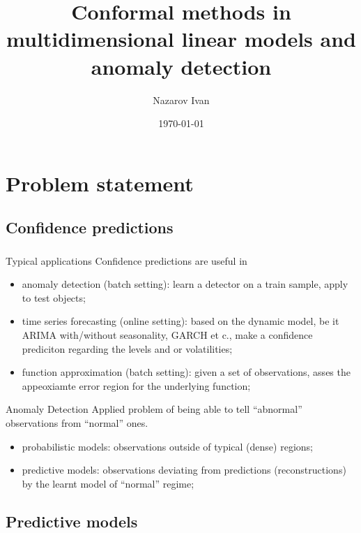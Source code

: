 \documentclass[t]{beamer}  %
\title{Conformal methods in multidimensional linear models and anomaly detection}
\author[Nazarov Ivan]{Nazarov Ivan}
\date{\today}
\institute[Higher School of Economics]{National Research University \\ Higher School of Economics}
\begin{document}
\frame[plain]{\titlepage} %

\section{Problem statement} %
\label{sec:problem_statement}
\subsection{Confidence predictions} %
\label{sub:confidence_predictions}

\begin{frame}[c]\frametitle{\insertsection}
  \framesubtitle{\insertsubsection}
  \begin{block}{Typical applications}
    Confidence predictions are useful in
    \begin{itemize}
      \item anomaly detection (batch setting): learn a detector on a train sample,
      apply to test objects;
      \item time series forecasting (online setting): based on the dynamic model, be
      it ARIMA with/without seasonality, GARCH et c., make a confidence prediciton
      regarding the levels and or volatilities;
      \item function approximation (batch setting): given a set of observations,
      asses the appeoxiamte error region for the underlying function;
    \end{itemize}
  \end{block}

  \begin{block}{Anomaly Detection}
    Applied problem of being able to tell ``abnormal'' observations from ``normal''
    ones. %
    \begin{itemize}
      \item probabilistic models: observations outside of typical (dense) regions;
      \item predictive models: observations deviating from predictions (reconstructions)
      by the learnt model of ``normal'' regime;
    \end{itemize}
  \end{block}
\end{frame}


\subsection{Predictive models} %
\label{sub:predictive_models}
\end{document}
